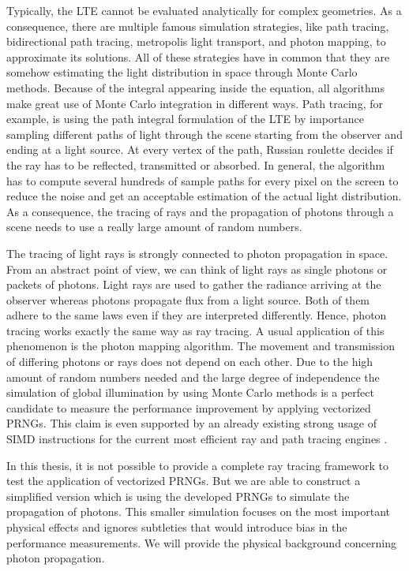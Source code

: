 \documentclass{stdlocal}
\begin{document}
    Typically, the LTE cannot be evaluated analytically for complex geometries.
    As a consequence, there are multiple famous simulation strategies, like path tracing, bidirectional path tracing, metropolis light transport, and photon mapping, to approximate its solutions.
    All of these strategies have in common that they are somehow estimating the light distribution in space through Monte Carlo methods.
    Because of the integral appearing inside the equation, all algorithms make great use of Monte Carlo integration in different ways.
    Path tracing, for example, is using the path integral formulation of the LTE by importance sampling different paths of light through the scene starting from the observer and ending at a light source.
    At every vertex of the path, Russian roulette decides if the ray has to be reflected, transmitted or absorbed.
    In general, the algorithm has to compute several hundreds of sample paths for every pixel on the screen to reduce the noise and get an acceptable estimation  of the actual light distribution.
    As a consequence, the tracing of rays and the propagation of photons through a scene needs to use a really large amount of random numbers.

    The tracing of light rays is strongly connected to photon propagation in space.
    From an abstract point of view, we can think of light rays as single photons or packets of photons.
    Light rays are used to gather the radiance arriving at the observer whereas photons propagate flux from a light source.
    Both of them adhere to the same laws even if they are interpreted differently.
    Hence, photon tracing works exactly the same way as ray tracing.
    A usual application of this phenomenon is the photon mapping algorithm.
    The movement and transmission of differing photons or rays does not depend on each other.
    Due to the high amount of random numbers needed and the large degree of independence the simulation of global illumination by using Monte Carlo methods is a perfect candidate to measure the performance improvement by applying vectorized PRNGs.
    This claim is even supported by an already existing strong usage of SIMD instructions for the current most efficient ray and path tracing engines \autocite{embree}.

    In this thesis, it is not possible to provide a complete ray tracing framework to test the application of vectorized PRNGs.
    But we are able to construct a simplified version which is using the developed PRNGs to simulate the propagation of photons.
    This smaller simulation focuses on the most important physical effects and ignores subtleties that would introduce bias in the performance measurements.
    We will provide the physical background concerning photon propagation.
\end{document}
